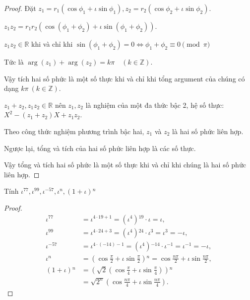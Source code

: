 \begin{proof}
    Đặt $z_{1} = r_{1}(\cos\phi_{1} + \iota\sin\phi_{1}), z_{2} = r_{2}(\cos\phi_{2} + \iota\sin\phi_{2})$.
    
    $z_{1}z_{2} = r_{1}r_{2}(\cos(\phi_{1} + \phi_{2}) + \iota\sin(\phi_{1} + \phi_{2}))$.
    
    $z_{1}z_{2}\in\mathbb{R}$ khi và chỉ khi $\sin(\phi_{1} + \phi_{2}) = 0\Leftrightarrow\phi_{1} + \phi_{2}\equiv 0\pmod\pi$
    
    Tức là $\arg(z_{1}) + \arg(z_{2}) = k\pi\quad (k\in\mathbb{Z})$.
    
    Vậy tích hai số phức là một số thực khi và chỉ khi tổng argument của chúng có dạng $k\pi\ (k\in\mathbb{Z})$.

    \bigskip
    $z_{1} + z_{2}, z_{1}z_{2}\in\mathbb{R}$ nên $z_{1}, z_{2}$ là nghiệm của một đa thức bậc 2, hệ số thực: $X^{2} - (z_{1} + z_{2})X + z_{1}z_{2}$.
    
    Theo công thức nghiệm phương trình bậc hai, $z_{1}$ và $z_{2}$ là hai số phức liên hợp.
    
    Ngược lại, tổng và tích của hai số phức liên hợp là các số thực.
    
    Vậy tổng và tích hai số phức là một số thực khi và chỉ khi chúng là hai số phức liên hợp.
\end{proof}

\begin{exercise}
    Tính $\iota^{77}, \iota^{99}, \iota^{-57}, \iota^{n}, (1 + \iota){}^{n}$
\end{exercise}

\begin{proof}
    \begin{align*}
        \iota^{77} & = \iota^{4\cdot 19 + 1} = (\iota^{4}){}^{19}\cdot\iota = \iota, \\
        \iota^{99} & = \iota^{4\cdot 24 + 3} = (\iota^{4}){}^{24}\cdot\iota^{3} = \iota^{3} = -\iota, \\
        \iota^{-57} & = \iota^{4\cdot(-14) - 1} = (\iota^{4}){}^{-14}\cdot\iota^{-1} = \iota^{-1} = -\iota, \\
        \iota^{n} & = \left(\cos\frac{\pi}{2} + \iota\sin\frac{\pi}{2}\right){}^{n}= \cos\frac{n\pi}{2} + \iota\sin\frac{n\pi}{2}, \\
        (1+\iota){}^{n} & = \left(\sqrt{2}\left(\cos\frac{\pi}{4} + \iota\sin\frac{\pi}{4}\right)\right){}^{n} \\
                        & = \sqrt{2^{n}}\left(\cos\frac{n\pi}{4} + \iota\sin\frac{n\pi}{4}\right).
    \end{align*}
\end{proof}

